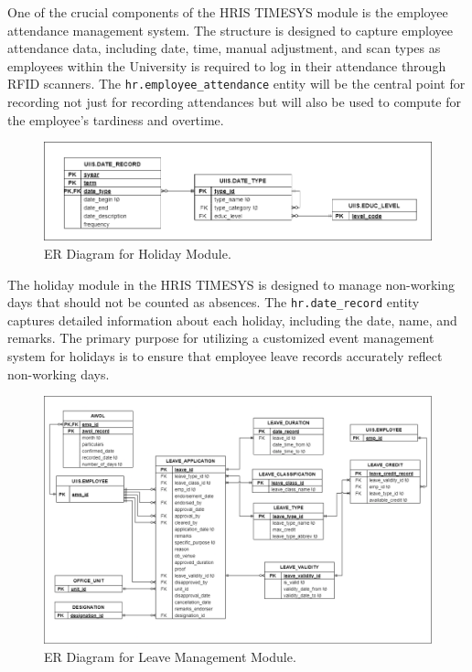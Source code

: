     One of the crucial components of the HRIS TIMESYS module is the employee attendance management system. The structure is designed to capture employee attendance data, including date, time, manual adjustment, and scan types as employees within the University is required to log in their attendance through RFID scanners. The \texttt{hr.employee\_attendance} entity will be the central point for recording not just for recording attendances but will also be used to compute for the employee's tardiness and overtime.

    \begin{figure}[H]
        \centering
        \includegraphics[width=1\linewidth]{figures/images/diagrams/erd/erd-timesys-holiday.png}
        \caption{ER Diagram for Holiday Module.}
        \label{fig:erd-timesys-holiday}
    \end{figure}

    The holiday module in the HRIS TIMESYS is designed to manage non-working days that should not be counted as absences. The \texttt{hr.date\_record} entity captures detailed information about each holiday, including the date, name, and remarks. The primary purpose for utilizing a customized event management system for holidays is to ensure that employee leave records accurately reflect non-working days. 

    \begin{figure}[H]
        \centering
        \includegraphics[width=1\linewidth]{figures/images/diagrams/erd/erd-leavesys-employee-leave.png}
        \caption{ER Diagram for Leave Management Module.}
        \label{fig:erd-leavesys-employee-leave}
    \end{figure}

